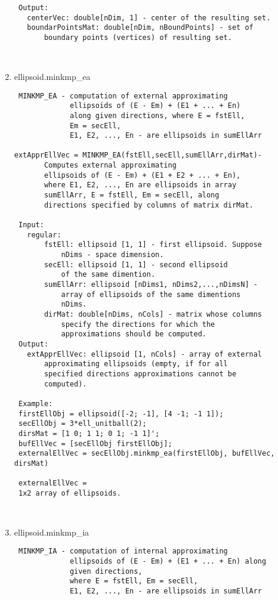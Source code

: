 \begin{enumerate}
\begin{lstlisting}
 Output:
   centerVec: double[nDim, 1] - center of the resulting set.
   boundarPointsMat: double[nDim, nBoundPoints] - set of
       boundary points (vertices) of resulting set.



\end{lstlisting}
\fontfamily{\familydefault}
\selectfont
\item {ellipsoid.minkmp\_ea}
\selectfont
\begin{lstlisting}
 MINKMP_EA - computation of external approximating
             ellipsoids of (E - Em) + (E1 + ... + En)
             along given directions, where E = fstEll,
             Em = secEll,
             E1, E2, ..., En - are ellipsoids in sumEllArr

extApprEllVec = MINKMP_EA(fstEll,secEll,sumEllArr,dirMat)-
       Computes external approximating
       ellipsoids of (E - Em) + (E1 + E2 + ... + En),
       where E1, E2, ..., En are ellipsoids in array
       sumEllArr, E = fstEll, Em = secEll, along
       directions specified by columns of matrix dirMat.

 Input:
   regular:
       fstEll: ellipsoid [1, 1] - first ellipsoid. Suppose
           nDims - space dimension.
       secEll: ellipsoid [1, 1] - second ellipsoid
           of the same dimention.
       sumEllArr: ellipsoid [nDims1, nDims2,...,nDimsN] -
           array of ellipsoids of the same dimentions
           nDims.
       dirMat: double[nDims, nCols] - matrix whose columns
           specify the directions for which the
           approximations should be computed.
 Output:
   extApprEllVec: ellipsoid [1, nCols] - array of external
       approximating ellipsoids (empty, if for all
       specified directions approximations cannot be
       computed).

 Example:
 firstEllObj = ellipsoid([-2; -1], [4 -1; -1 1]);
 secEllObj = 3*ell_unitball(2);
 dirsMat = [1 0; 1 1; 0 1; -1 1]';
 bufEllVec = [secEllObj firstEllObj];
 externalEllVec = secEllObj.minkmp_ea(firstEllObj, bufEllVec, dirsMat)

 externalEllVec =
 1x2 array of ellipsoids.



\end{lstlisting}
\fontfamily{\familydefault}
\selectfont
\item {ellipsoid.minkmp\_ia}
\selectfont
\begin{lstlisting}
 MINKMP_IA - computation of internal approximating
             ellipsoids of (E - Em) + (E1 + ... + En) along
             given directions,
             where E = fstEll, Em = secEll,
             E1, E2, ..., En - are ellipsoids in sumEllArr


\end{lstlisting}
\end{enumerate}
